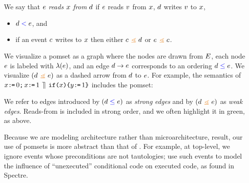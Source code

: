 \begin{definition}
  \label{def:rf}
  We say that $e$ \emph{reads $x$ from} $d$ if $e$ reads $v$
  from $x$, $d$ writes $v$ to $x$, 
  \begin{itemize}
  \item $d \mathrel{{\color{blue}<}} e$, and
  \item if an event $c$ writes to $x$ then either $\cEv \gtN \bEv$ or $\aEv \gtN \cEv$.
  \end{itemize}    
\end{definition}


We visualize a pomset as a graph where the nodes are drawn from $E$,
each node $e$ is labeled with $\lambda(e)$, and an edge
$d \rightarrow e$ corresponds to an ordering $d\mathrel{{\color{blue}\leq}}e$.  We
visualize $(\bEv \gtN \aEv)$ as a dashed arrow from $d$ to $e$.
For example, the semantics of
\begin{math}
  x\texttt{:}\mkern-1mu\texttt{=}\, 0\texttt{;}\,
  x\texttt{:}\mkern-1mu\texttt{=}\, 1
  \,\mathbin{\rrceil}\,
  \texttt{if}\allowbreak\texttt{(}x\texttt{)}\allowbreak\texttt{\{} y\texttt{:}\mkern-1mu\texttt{=}\, 1\texttt{\}}
\end{math}
includes the pomset:
\begin{tikzdisplay}[node distance=1em]
\end{tikzdisplay}
We refer to edges introduced by $(d \mathrel{{\color{blue}\leq}} e)$ as \emph{strong edges} and
by $(\bEv \gtN \aEv)$ as \emph{weak edges}.
Reads-from is included in strong order, and we often highlight it in green, as above.


Because we are modeling architecture rather than microarchitecture, result,
our use of pomsets is more abstract than that of \citeauthor{2019-sp}.  For
example, at top-level, we ignore events whose preconditions are not
tautologies; \citeauthor{2019-sp} use such events to model the influence of
``unexecuted'' conditional code on executed code, as found in Spectre.

